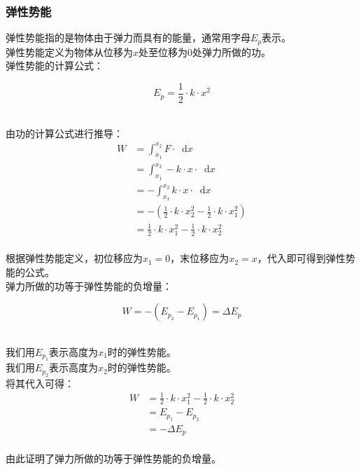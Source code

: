 \documentclass[UTF8]{ctexart}
\newcommand*{\dif}{\mathop{}\!\mathrm{d}}
\begin{document}
\newpage

\subsubsection{弹性势能}
    弹性势能指的是物体由于弹力而具有的能量，通常用字母$E_p$表示。\\[3mm]
    弹性势能定义为物体从位移为$x$处至位移为$0$处弹力所做的功。\\[3mm]
    弹性势能的计算公式：
    \begin{large}
        \begin{equation*}
            E_p=\frac{1}{2}\cdot k\cdot x^2
        \end{equation*}
    \end{large}\\
    由功的计算公式进行推导：
    \setcounter{equation}{0}
    \begin{align}
        W
        &=\int_{x_1}^{x_2}F\cdot\dif x\\[3mm]
        &=\int_{x_1}^{x_2}-k\cdot x\cdot\dif x\\[3mm]
        &=-\int_{x_1}^{x_2}k\cdot x\cdot\dif x\\[3mm]
        &=-(\frac{1}{2}\cdot k\cdot x_2^2-\frac{1}{2}\cdot k\cdot x_1^2)\\[3mm]
        &=\frac{1}{2}\cdot k\cdot x_1^2-\frac{1}{2}\cdot k\cdot x_2^2
    \end{align}\\
    根据弹性势能定义，初位移应为$x_1=0$，末位移应为$x_2=x$，代入即可得到弹性势能的公式。\\[12mm]
    弹力所做的功等于弹性势能的负增量：
    \begin{large}
        \begin{equation*}
            W=-(E_{p_2}-E_{p_1})=\Delta E_p
        \end{equation*}
    \end{large}\\
    我们用$E_{p_1}$表示高度为$x_1$时的弹性势能。\\[3mm]
    我们用$E_{p_2}$表示高度为$x_2$时的弹性势能。\\[3mm]
    将其代入可得：
    \begin{align}
        W
        &=\frac{1}{2}\cdot k\cdot x_1^2-\frac{1}{2}\cdot k\cdot x_2^2\\[3mm]
        &=E_{p_1}-E_{p_2}\\[3mm]
        &=-\Delta E_p
    \end{align}\\
    由此证明了弹力所做的功等于弹性势能的负增量。
\end{document}
